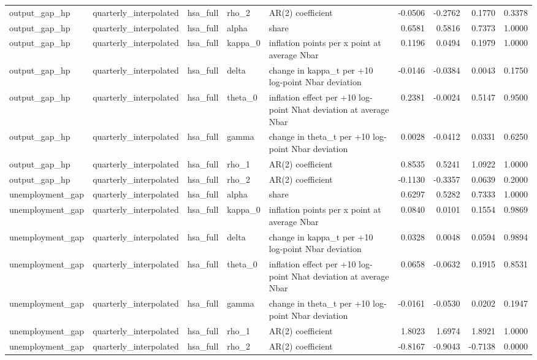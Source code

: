 \begin{tabular}{lllllrrrr}
output\_gap\_hp & quarterly\_interpolated & hsa\_full & rho\_2 & AR(2) coefficient & -0.0506 & -0.2762 & 0.1770 & 0.3378 \\
output\_gap\_hp & quarterly\_interpolated & hsa\_full & alpha & share & 0.6581 & 0.5816 & 0.7373 & 1.0000 \\
output\_gap\_hp & quarterly\_interpolated & hsa\_full & kappa\_0 & inflation points per x point at average Nbar & 0.1196 & 0.0494 & 0.1979 & 1.0000 \\
output\_gap\_hp & quarterly\_interpolated & hsa\_full & delta & change in kappa\_t per +10 log-point Nbar deviation & -0.0146 & -0.0384 & 0.0043 & 0.1750 \\
output\_gap\_hp & quarterly\_interpolated & hsa\_full & theta\_0 & inflation effect per +10 log-point Nhat deviation at average Nbar & 0.2381 & -0.0024 & 0.5147 & 0.9500 \\
output\_gap\_hp & quarterly\_interpolated & hsa\_full & gamma & change in theta\_t per +10 log-point Nbar deviation & 0.0028 & -0.0412 & 0.0331 & 0.6250 \\
output\_gap\_hp & quarterly\_interpolated & hsa\_full & rho\_1 & AR(2) coefficient & 0.8535 & 0.5241 & 1.0922 & 1.0000 \\
output\_gap\_hp & quarterly\_interpolated & hsa\_full & rho\_2 & AR(2) coefficient & -0.1130 & -0.3357 & 0.0639 & 0.2000 \\
unemployment\_gap & quarterly\_interpolated & hsa\_full & alpha & share & 0.6297 & 0.5282 & 0.7333 & 1.0000 \\
unemployment\_gap & quarterly\_interpolated & hsa\_full & kappa\_0 & inflation points per x point at average Nbar & 0.0840 & 0.0101 & 0.1554 & 0.9869 \\
unemployment\_gap & quarterly\_interpolated & hsa\_full & delta & change in kappa\_t per +10 log-point Nbar deviation & 0.0328 & 0.0048 & 0.0594 & 0.9894 \\
unemployment\_gap & quarterly\_interpolated & hsa\_full & theta\_0 & inflation effect per +10 log-point Nhat deviation at average Nbar & 0.0658 & -0.0632 & 0.1915 & 0.8531 \\
unemployment\_gap & quarterly\_interpolated & hsa\_full & gamma & change in theta\_t per +10 log-point Nbar deviation & -0.0161 & -0.0530 & 0.0202 & 0.1947 \\
unemployment\_gap & quarterly\_interpolated & hsa\_full & rho\_1 & AR(2) coefficient & 1.8023 & 1.6974 & 1.8921 & 1.0000 \\
unemployment\_gap & quarterly\_interpolated & hsa\_full & rho\_2 & AR(2) coefficient & -0.8167 & -0.9043 & -0.7138 & 0.0000 \\

\end{tabular}

